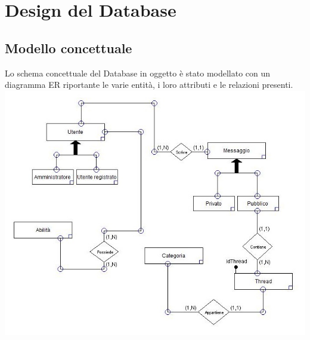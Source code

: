 \documentclass[a4paper,12pt]{article}
\begin{document}
\clearpage

\section{Design del Database}
\subsection{Modello concettuale}
Lo schema concettuale del Database in oggetto è stato modellato con un diagramma ER riportante le varie entità, i loro attributi e le relazioni presenti.\\
\includegraphics[scale=0.751]{modelloER.png}
\end{document}
